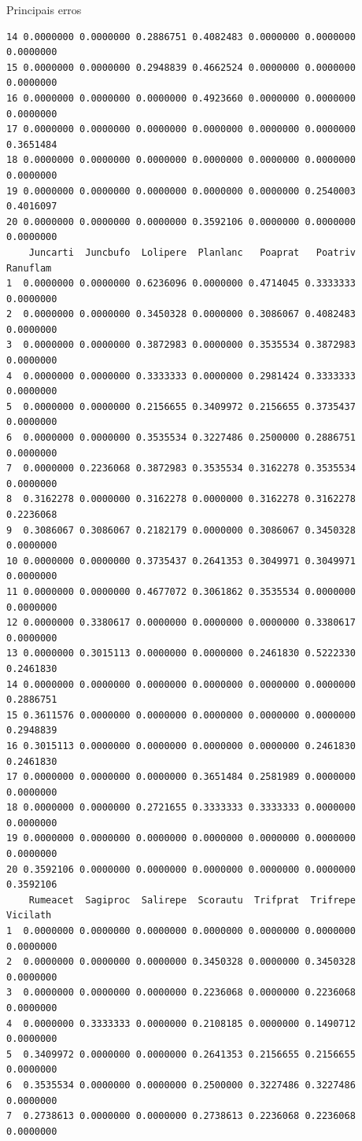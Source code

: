 \documentclass[
  ignorenonframetext,
]{beamer}
\begin{document}
\begin{frame}[fragile]{}
\begin{block}{Principais erros}
\begin{verbatim}
14 0.0000000 0.0000000 0.2886751 0.4082483 0.0000000 0.0000000 0.0000000
15 0.0000000 0.0000000 0.2948839 0.4662524 0.0000000 0.0000000 0.0000000
16 0.0000000 0.0000000 0.0000000 0.4923660 0.0000000 0.0000000 0.0000000
17 0.0000000 0.0000000 0.0000000 0.0000000 0.0000000 0.0000000 0.3651484
18 0.0000000 0.0000000 0.0000000 0.0000000 0.0000000 0.0000000 0.0000000
19 0.0000000 0.0000000 0.0000000 0.0000000 0.0000000 0.2540003 0.4016097
20 0.0000000 0.0000000 0.0000000 0.3592106 0.0000000 0.0000000 0.0000000
    Juncarti  Juncbufo  Lolipere  Planlanc   Poaprat   Poatriv  Ranuflam
1  0.0000000 0.0000000 0.6236096 0.0000000 0.4714045 0.3333333 0.0000000
2  0.0000000 0.0000000 0.3450328 0.0000000 0.3086067 0.4082483 0.0000000
3  0.0000000 0.0000000 0.3872983 0.0000000 0.3535534 0.3872983 0.0000000
4  0.0000000 0.0000000 0.3333333 0.0000000 0.2981424 0.3333333 0.0000000
5  0.0000000 0.0000000 0.2156655 0.3409972 0.2156655 0.3735437 0.0000000
6  0.0000000 0.0000000 0.3535534 0.3227486 0.2500000 0.2886751 0.0000000
7  0.0000000 0.2236068 0.3872983 0.3535534 0.3162278 0.3535534 0.0000000
8  0.3162278 0.0000000 0.3162278 0.0000000 0.3162278 0.3162278 0.2236068
9  0.3086067 0.3086067 0.2182179 0.0000000 0.3086067 0.3450328 0.0000000
10 0.0000000 0.0000000 0.3735437 0.2641353 0.3049971 0.3049971 0.0000000
11 0.0000000 0.0000000 0.4677072 0.3061862 0.3535534 0.0000000 0.0000000
12 0.0000000 0.3380617 0.0000000 0.0000000 0.0000000 0.3380617 0.0000000
13 0.0000000 0.3015113 0.0000000 0.0000000 0.2461830 0.5222330 0.2461830
14 0.0000000 0.0000000 0.0000000 0.0000000 0.0000000 0.0000000 0.2886751
15 0.3611576 0.0000000 0.0000000 0.0000000 0.0000000 0.0000000 0.2948839
16 0.3015113 0.0000000 0.0000000 0.0000000 0.0000000 0.2461830 0.2461830
17 0.0000000 0.0000000 0.0000000 0.3651484 0.2581989 0.0000000 0.0000000
18 0.0000000 0.0000000 0.2721655 0.3333333 0.3333333 0.0000000 0.0000000
19 0.0000000 0.0000000 0.0000000 0.0000000 0.0000000 0.0000000 0.0000000
20 0.3592106 0.0000000 0.0000000 0.0000000 0.0000000 0.0000000 0.3592106
    Rumeacet  Sagiproc  Salirepe  Scorautu  Trifprat  Trifrepe  Vicilath
1  0.0000000 0.0000000 0.0000000 0.0000000 0.0000000 0.0000000 0.0000000
2  0.0000000 0.0000000 0.0000000 0.3450328 0.0000000 0.3450328 0.0000000
3  0.0000000 0.0000000 0.0000000 0.2236068 0.0000000 0.2236068 0.0000000
4  0.0000000 0.3333333 0.0000000 0.2108185 0.0000000 0.1490712 0.0000000
5  0.3409972 0.0000000 0.0000000 0.2641353 0.2156655 0.2156655 0.0000000
6  0.3535534 0.0000000 0.0000000 0.2500000 0.3227486 0.3227486 0.0000000
7  0.2738613 0.0000000 0.0000000 0.2738613 0.2236068 0.2236068 0.0000000

\end{verbatim}
\end{block}
\end{frame}
\end{document}
